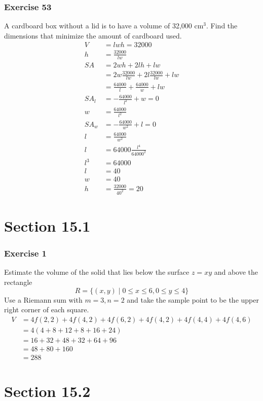 \documentclass[letterpaper, 12pt]{math}
\begin{document}
\subsubsection*{Exercise 53}
A cardboard box without a lid is to have a volume of 32,000 \( \text{cm}^3 \).
Find the dimensions that minimize the amount of cardboard used.
\begin{align*}
  V &= lwh = 32000 \\
  h &= \frac{32000}{lw} \\
  SA &= 2wh+2lh+lw \\
  &= 2w\frac{32000}{lw}+2l\frac{32000}{lw}+lw \\
  &= \frac{64000}{l}+\frac{64000}{w}+lw \\
  SA_l &= -\frac{64000}{l^2}+w = 0 \\
  w &= \frac{64000}{l^2} \\
  SA_w &= -\frac{64000}{w^2}+l = 0 \\
  l &= \frac{64000}{w^2} \\
  l &= 64000\frac{l^4}{64000^2} \\
  l^3 &= 64000 \\
  l &= 40 \\
  w &= 40 \\
  h &= \frac{32000}{40^2} = 20
\end{align*}

\section*{Section 15.1}

\subsubsection*{Exercise 1}
Estimate the volume of the solid that lies below the surface \( z = xy \) and
above the rectangle
\[ R = \{(x,y)\mid0\le x\le6,0\le y\le4\} \]
Use a Riemann sum with \( m = 3, n = 2 \) and take the sample point to be the
upper right corner of each square.
\begin{align*}
  V &= 4f(2,2)+4f(4,2)+4f(6,2)+4f(4,2)+4f(4,4)+4f(4,6) \\
  &= 4(4+8+12+8+16+24) \\
  &= 16+32+48+32+64+96 \\
  &= 48+80+160 \\
  &= 288
\end{align*}

\section*{Section 15.2}
\end{document}
